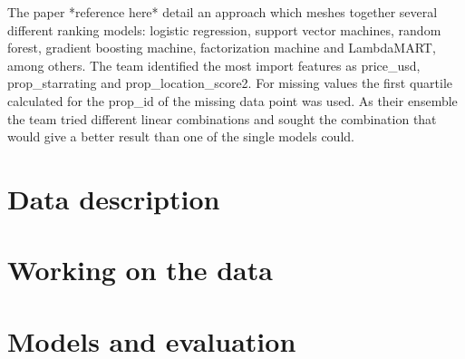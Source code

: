 \documentclass{llncs}
\begin{document}
The paper *reference here* detail an approach which meshes together several different ranking models: logistic regression, support vector machines, random forest, gradient boosting machine, factorization machine and LambdaMART, among others. The team identified the most import features as price\_usd, prop\_starrating and prop\_location\_score2. For missing values the first quartile calculated for the prop\_id of the missing data point was used. As their ensemble the team tried different linear combinations and sought the combination that would give a better result than one of the single models could.  

 
\section{Data description}

\section{Working on the data}

\section{Models and evaluation}




          


\end{document}
